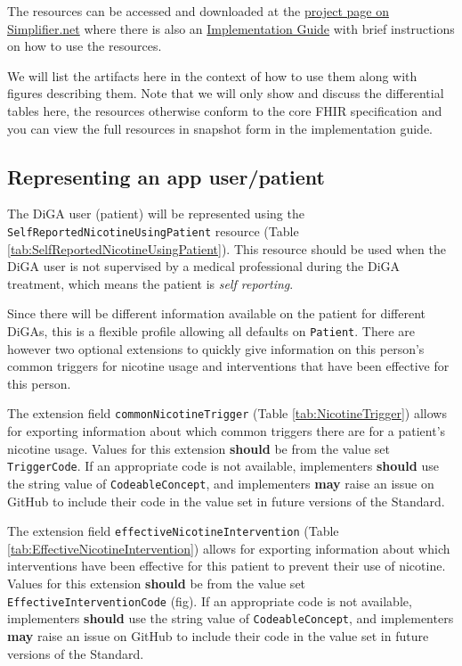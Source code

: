 \documentclass[12px]{report}
\def\code#1{\texttt{#1}} %
\newcommand{\tabpatient}{}
\newcommand{\tabtriggerext}{}
\newcommand{\tabinterventionext}{}
\begin{document}
The resources can be accessed and downloaded at the \href{https://simplifier.net/treat-nicotine-usage-diga}{project page on Simplifier.net} where there is also an \href{https://simplifier.net/guide/self-reported-nicotine-usage-diga/home}{Implementation Guide} \cite{ig} with brief instructions on how to use the resources.

We will list the artifacts here in the context of how to use them along with figures describing them. Note that we will only show and discuss the differential tables here, the resources otherwise conform to the core FHIR specification and you can view the full resources in snapshot form in the implementation guide.

\subsection{Representing an app user/patient}
\tabpatient
The DiGA user (patient) will be represented using the \code{SelfReportedNicotineUsingPatient} resource (Table \ref{tab:SelfReportedNicotineUsingPatient}). This resource should be used when the DiGA user is not supervised by a medical professional during the DiGA treatment, which means the
patient is \textit{self reporting}.

Since there will be different information available on the patient for different DiGAs, this is a flexible profile allowing all defaults on \code{Patient}. 
There are however two optional extensions to quickly give information on this person's common triggers for nicotine usage and interventions that have been effective for this person.

\tabtriggerext
The extension field \code{commonNicotineTrigger} (Table \ref{tab:NicotineTrigger}) allows for exporting information about which common triggers there are for a patient's nicotine usage. 
Values for this extension \textbf{should} be from the value set \code{TriggerCode}. If an appropriate code is not available, implementers \textbf{should} use the string value of \code{CodeableConcept}, 
and implementers \textbf{may} raise an issue on GitHub \cite{github} to include their code in the value set in future versions of the Standard.




\tabinterventionext
The extension field \code{effectiveNicotineIntervention} (Table \ref{tab:EffectiveNicotineIntervention}) allows for exporting information about which interventions have been effective for this patient to prevent their use of nicotine.
Values for this extension \textbf{should} be from the value set \code{EffectiveInterventionCode} (fig). If an appropriate code is not available, implementers \textbf{should} use the string value of \code{CodeableConcept}, 
and implementers \textbf{may} raise an issue on GitHub \cite{github} to include their code in the value set in future versions of the Standard.
\end{document}
